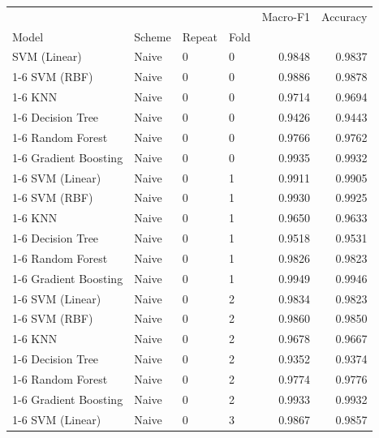 \begin{table}
\label{tab:Ext14a_leakage_all_models_fold_scores}
\begin{tabular}{llllrr}
\toprule
 &  &  &  & Macro-F1 & Accuracy \\
Model & Scheme & Repeat & Fold &  &  \\
\midrule
SVM (Linear) & Naive & 0 & 0 & 0.9848 & 0.9837 \\
\cline{1-6} \cline{2-6} \cline{3-6}
SVM (RBF) & Naive & 0 & 0 & 0.9886 & 0.9878 \\
\cline{1-6} \cline{2-6} \cline{3-6}
KNN & Naive & 0 & 0 & 0.9714 & 0.9694 \\
\cline{1-6} \cline{2-6} \cline{3-6}
Decision Tree & Naive & 0 & 0 & 0.9426 & 0.9443 \\
\cline{1-6} \cline{2-6} \cline{3-6}
Random Forest & Naive & 0 & 0 & 0.9766 & 0.9762 \\
\cline{1-6} \cline{2-6} \cline{3-6}
Gradient Boosting & Naive & 0 & 0 & 0.9935 & 0.9932 \\
\cline{1-6} \cline{2-6} \cline{3-6}
SVM (Linear) & Naive & 0 & 1 & 0.9911 & 0.9905 \\
\cline{1-6} \cline{2-6} \cline{3-6}
SVM (RBF) & Naive & 0 & 1 & 0.9930 & 0.9925 \\
\cline{1-6} \cline{2-6} \cline{3-6}
KNN & Naive & 0 & 1 & 0.9650 & 0.9633 \\
\cline{1-6} \cline{2-6} \cline{3-6}
Decision Tree & Naive & 0 & 1 & 0.9518 & 0.9531 \\
\cline{1-6} \cline{2-6} \cline{3-6}
Random Forest & Naive & 0 & 1 & 0.9826 & 0.9823 \\
\cline{1-6} \cline{2-6} \cline{3-6}
Gradient Boosting & Naive & 0 & 1 & 0.9949 & 0.9946 \\
\cline{1-6} \cline{2-6} \cline{3-6}
SVM (Linear) & Naive & 0 & 2 & 0.9834 & 0.9823 \\
\cline{1-6} \cline{2-6} \cline{3-6}
SVM (RBF) & Naive & 0 & 2 & 0.9860 & 0.9850 \\
\cline{1-6} \cline{2-6} \cline{3-6}
KNN & Naive & 0 & 2 & 0.9678 & 0.9667 \\
\cline{1-6} \cline{2-6} \cline{3-6}
Decision Tree & Naive & 0 & 2 & 0.9352 & 0.9374 \\
\cline{1-6} \cline{2-6} \cline{3-6}
Random Forest & Naive & 0 & 2 & 0.9774 & 0.9776 \\
\cline{1-6} \cline{2-6} \cline{3-6}
Gradient Boosting & Naive & 0 & 2 & 0.9933 & 0.9932 \\
\cline{1-6} \cline{2-6} \cline{3-6}
SVM (Linear) & Naive & 0 & 3 & 0.9867 & 0.9857 \\

\end{tabular}
\end{table}
